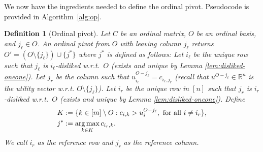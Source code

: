 \documentclass[11pt]{article}
\newtheorem{definition}[theorem]{Definition}
\begin{document}
We now have the ingredients needed to define the ordinal pivot. Pseudocode is provided in Algorithm~\ref{alg:op}.

\begin{definition}[Ordinal pivot]\label{def:appopdef}
Let $C$ be an ordinal matrix, $O$ be an ordinal basis, and $j_\ell\in O$. An \emph{ordinal pivot} from $O$ with leaving column $j_\ell$ returns $O'=(O\setminus \{j_\ell\}) \cup \{j^*\}$ where $j^*$ is defined as follows: 
Let $i_{\ell}$ be the unique row such that $j_{\ell}$ is $i_{\ell}$-disliked w.r.t.~$O$ (exists and unique by Lemma \ref{lem:disliked-oneone}). 
Let $j_r$ be the column such that $u^{O-j_\ell}_{i_\ell}=c_{i_\ell,j_r}$ (recall that $u^{O-j_\ell}\in\mathbb{R}^n$ is the utility vector w.r.t. $O\setminus\{j_\ell\}$). 
Let $i_r$ be the unique row in $[n]$ such that $j_r$ is $i_r$-disliked w.r.t.~$O$ (exists and unique by Lemma \ref{lem:disliked-oneone}). Define
\begin{align}\label{eq:appchoiceoford}
    K&:=\{k\in[m]\setminus O:c_{i,k}>u^{O-j_\ell}_i, \textrm{ for all } i\neq i_r\},\\
    j^*&:=\mathop{\arg\max}_{k\in K} c_{i_r, k}. \notag
\end{align}
We call $i_r$ as the \emph{reference row} and $j_r$ as the \emph{reference column}. 
\end{definition}

\begin{algorithm}
\caption{Ordinal Pivot}\label{alg:op}
\begin{algorithmic}
\end{algorithmic}
\end{algorithm}
\end{document}
